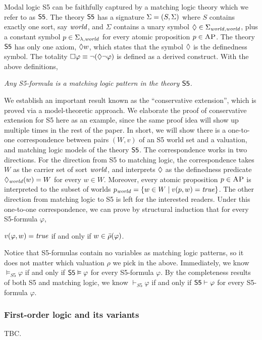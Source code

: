 \documentclass{amsart}
\begin{document}
Modal logic S5 can be faithfully captured by
a matching logic theory which we refer to as $\mathsf{S5}$.
The theory $\mathsf{S5}$ has a signature ${\Sigma} = (S, \Sigma)$ where
$S$ contains exactly one sort, say $\mathit{world}$,
and $\Sigma$ contains a unary symbol
${\lozenge} \in \Sigma_{\mathit{world},\mathit{world}}$,
plus a constant symbol $p \in \Sigma_{\lambda,\mathit{world}}$
for every atomic proposition $p \in \textsc{AP}$.
The theory $\mathsf{S5}$ has only one axiom, ${\lozenge} w$, which states that
the symbol ${\lozenge}$ is the definedness symbol.
The totality ${\square} \varphi \equiv \neg ({\lozenge} \neg \varphi)$
is defined as a derived construct.
With the above definitions,
\begin{center}
\emph{
Any S5-formula is a matching logic pattern in the theory $\mathsf{S5}$.
}
\end{center}

We establish an important result known as the ``conservative extension'',
which is proved via a model-theoretic approach.
We elaborate the proof of conservative extension for S5 here as an example,
since the same proof idea will show up multiple times in the rest of the paper.
In short, we will show there is a one-to-one correspondence between
pairs $(W,v)$ of an S5 world set and a valuation, 
and matching logic models of the theory $\mathsf{S5}$.
The correspondence works in two directions.
For the direction from S5 to matching logic,
the correspondence takes $W$ as the carrier set of sort $\mathit{world}$,
and interprets ${\lozenge}$ as the definedness predicate
${\lozenge}_{\mathit{world}} (w) = W$ for every $w \in W$.
Moreover, every atomic proposition $p \in \textsc{AP}$ is interpreted to
the subset of worlds $p_{\mathit{world}} = \{ w \in W \mid v(p, w) = \mathit{true} \}$.
The other direction from matching logic to S5 is left for 
the interested readers.
Under this one-to-one correspondence, 
we can prove by structural induction that for every S5-formula $\varphi$,
\begin{center}
$v(\varphi, w) = \mathit{true}$
\quad if and only if \quad
$w \in \bar{\rho}(\varphi)$.
\end{center}
Notice that S5-formulas contain no variables as matching logic patterns,
so it does not matter which valuation $\rho$ we pick in the above.
Immediately, we know $\vDash_{S5} \varphi$ if and only if
$\mathsf{S5} \vDash \varphi$ for every S5-formula $\varphi$.
By the completeness results of both S5 and matching logic,
we know $\vdash_{S5} \varphi$ if and only if $\mathsf{S5} \vdash \varphi$
for every S5-formula $\varphi$.

\subsubsection{First-order logic and its variants}
TBC.
\end{document}
